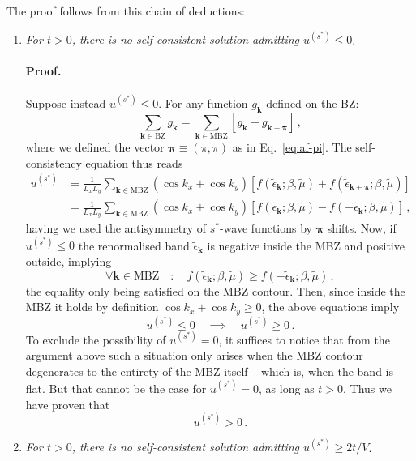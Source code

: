 \begin{tabproof}
The proof follows from this chain of deductions:	
\begin{enumerate}
	\item \textit{For $t>0$, there is no self-consistent solution admitting $u^{(s^*)}\le0$}. 
	
	\paragraph{Proof.}
	
	Suppose instead $u^{(s^*)}\le0$. For any function $g_\mathbf{k}$ defined on the BZ:
	\[
		\sum_{\mathbf{k}\in\mathrm{BZ}} g_\mathbf{k} = \sum_{\mathbf{k}\in\mathrm{MBZ}} \left[
		g_\mathbf{k} + g_{\mathbf{k}+\bm{\pi}}
		\right] \, ,
	\]
	where we defined the vector $\bm{\pi}\equiv(\pi,\pi)$ as in Eq.~\eqref{eq:af-pi}. The self-consistency equation thus reads
	\begin{align}
		u^{(s^*)} &= \frac{1}{L_x L_y} \sum_{\mathbf{k}\in\mathrm{MBZ}} (\cos k_x + \cos k_y) \left[
		f(\tilde{\epsilon}_\mathbf{k};\beta,\tilde{\mu}) + f(\tilde{\epsilon}_{\mathbf{k}+\bm{\pi}};\beta,\tilde{\mu})
		\right] \nonumber \\
		&= \frac{1}{L_x L_y} \sum_{\mathbf{k}\in\mathrm{MBZ}} (\cos k_x + \cos k_y) \left[
		f(\tilde{\epsilon}_\mathbf{k};\beta,\tilde{\mu}) - f(-\tilde{\epsilon}_\mathbf{k};\beta,\tilde{\mu})
		\right] \, , \label{appeq:normal-us*-constraint-int1}
	\end{align}
	having we used the antisymmetry of $s^*$-wave functions by $\bm{\pi}$ shifts. Now, if $u^{(s^*)}\le0$ the renormalised band $\tilde{\epsilon}_\mathbf{k}$ is negative inside the MBZ and positive outside, implying
	\[
		\forall \mathbf{k} \in \mathrm{MBZ}
		\quad\colon\quad
		f(\tilde{\epsilon}_\mathbf{k};\beta,\tilde{\mu}) \ge f(-\tilde{\epsilon}_\mathbf{k};\beta,\tilde{\mu}) \, ,
	\]
	the equality only being satisfied on the MBZ contour. Then, since inside the MBZ it holds by definition $\cos k_x + \cos k_y \ge 0$, the above equations imply
	\[
		u^{(s^*)} \le 0 
		\quad\implies\quad
		u^{(s^*)} \ge 0 \, .
	\]
	To exclude the possibility of $u^{(s^*)}=0$, it suffices to notice that from the argument above such a situation only arises when the MBZ contour degenerates to the entirety of the MBZ itself -- which is, when the band is flat. But that cannot be the case for $u^{(s^*)} = 0$, as long as $t>0$. Thus we have proven that
	\[
		u^{(s^*)} > 0 \, .
	\]
	\item \textit{For $t>0$, there is no self-consistent solution admitting $u^{(s^*)} \ge 2t/V$}.
	

\end{enumerate}
\end{tabproof}
